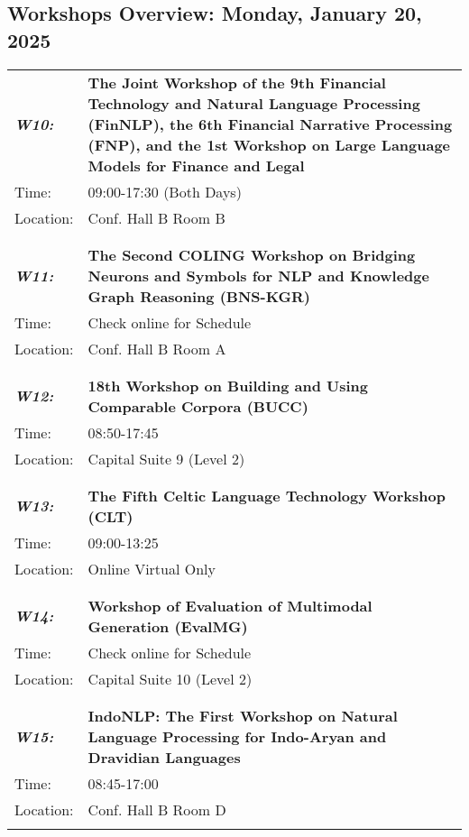 \subsection{Workshops Overview: Monday, January 20, 2025}
\begin{longtable}{p{15mm}p{100mm}}
\emph{\textbf{W10:}} & \textbf{The Joint Workshop of the 9th Financial Technology and Natural Language Processing (FinNLP), the 6th Financial Narrative Processing (FNP), and the 1st Workshop on Large Language Models for Finance and Legal} \\
Time: & 09:00-17:30 (Both Days) \\
Location: & Conf. Hall B Room B \\\\
\hline\\
\emph{\textbf{W11:}} & \textbf{The Second COLING Workshop on Bridging Neurons and Symbols for NLP and Knowledge Graph Reasoning (BNS-KGR)} \\
Time: & Check online for Schedule \\
Location: & Conf. Hall B Room A \\\\
\hline\\
\emph{\textbf{W12:}} & \textbf{18th Workshop on Building and Using Comparable Corpora (BUCC)} \\
Time: & 08:50-17:45 \\
Location: & Capital Suite 9 (Level 2) \\\\
\hline\\
\emph{\textbf{W13:}} & \textbf{The Fifth Celtic Language Technology Workshop (CLT)} \\
Time: & 09:00-13:25 \\
Location: & Online Virtual Only \\\\
\hline\\
\emph{\textbf{W14:}} & \textbf{Workshop of Evaluation of Multimodal Generation (EvalMG)} \\
Time: & Check online for Schedule \\
Location: & Capital Suite 10 (Level 2) \\\\
\hline\\
\emph{\textbf{W15:}} & \textbf{IndoNLP: The First Workshop on Natural Language Processing for Indo-Aryan and Dravidian Languages} \\
Time: & 08:45-17:00 \\
Location: & Conf. Hall B Room D \\\\

\end{longtable}
